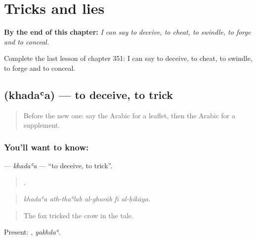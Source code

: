 
\chapter{Tricks and lies}
\label{ch:ar-tricks-and-lies}

\begin{chapteropening}
\textbf{By the end of this chapter:} \emph{I can say to deceive, to cheat, to swindle, to forge and to conceal.}

Complete the last lesson of chapter 351: I can say to deceive, to cheat, to swindle, to forge and to conceal.
\end{chapteropening}

\section[\texorpdfstring{\ar{خدع} (khadaʿa)}{خدع (khadaʿa)}]{ (khadaʿa) — to deceive, to trick}

\label{lesson:AR-C351-khadaa-trick}



\begin{quote}
Before the new one: say the Arabic for a leaflet, then the Arabic for a supplement.
\end{quote}

\subsection*{You'll want to know: }
\textbf{} — \emph{khadaʿa} — \textquotedblleft{}to deceive, to trick\textquotedblright{}.

\begin{quote}
    .
\end{quote}

\begin{quote}
\emph{khadaʿa ath-thaʿlab al-ghurāb fī al-ḥikāya.}
\end{quote}

\begin{quote}
The fox tricked the crow in the tale.
\end{quote}

Present: , \emph{yakhdaʿ}.

